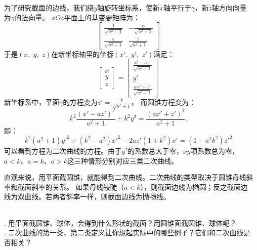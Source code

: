 \documentclass[12pt,UTF8,fontset=none]{ctexbook}
\begin{document}
为了研究截面的边线，我们绕$y$轴旋转坐标系，使新$x$轴平行于$\gamma$，新$z$轴方向向量为$\gamma$的法向量。
$xOz$平面上的基变更矩阵为：
$$
\begin{bmatrix}
    \frac{1}{\sqrt{a^2+1}} & -\frac{a}{\sqrt{a^2+1}} \\
    \frac{a}{\sqrt{a^2+1}} & \frac{1}{\sqrt{a^2+1}}
\end{bmatrix}
$$
于是$(x,\,\,y,\,\,z)$在新坐标轴里的坐标$(x',\,\,y',\,\,z')$满足：
$$
\begin{bmatrix}
    x \\ y \\ z
\end{bmatrix}
= 
\begin{bmatrix}
    \frac{x' - az'}{\sqrt{a^2+1}} \\ y' \\ \frac{ax' + z'}{\sqrt{a^2+1}}
\end{bmatrix}
$$
新坐标系中，平面$\gamma$的方程变为$z'=\frac{b}{\sqrt{a^2+1}}$，
而圆锥方程变为：
$$ k^2\frac{(x' - az')^2}{a^2+1} + k^2y^2 = \frac{(ax' + z')^2}{a^2+1} . $$
即：
$$ k^2(a^2+1)y'^2 + (k^2 - a^2)x'^2 - 2az'(1 + k^2)x' = (1 - a^2k^2)z'^2 $$
可以看到方程为二次曲线的方程。由于$y^2$的系数总大于零，$xy$项系数总为零，
$a<k$、$a=k$、$a>k$这三种情形分别对应三类二次曲线。


直观来说，用平面截圆锥，就能得到二次曲线。二次曲线的类型取决于圆锥母线斜率和截面斜率的关系。
如果母线较陡（$a<k$），则截面边线为椭圆；反之截面边线为双曲线。若两者斜率一样，则截面边线为抛物线。

\begin{sk}
    \mbox{} \\
    . 用平面截圆锥、球体，会得到什么形状的截面？用圆锥面截圆锥、球体呢？\\
    . 二次曲线的第一类、第二类定义让你想起实际中的哪些例子？它们和二次曲线是否相关？
\end{sk}
\end{document}
